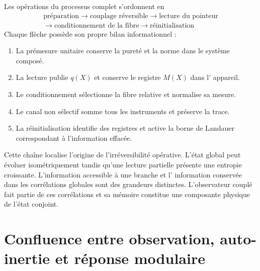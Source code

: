 Les opérations du processus complet s'ordonnent en
\begin{equation}
 \boxed{\begin{gathered}
 \text{préparation}
 \longrightarrow
 \text{couplage réversible}
 \longrightarrow
 \text{lecture du pointeur}\\
 \longrightarrow
 \text{conditionnement de la fibre}
 \longrightarrow
 \text{réinitialisation}
 \end{gathered}}
 \label{eq:rm-obs-measurement-chain}
\end{equation}
Chaque flèche possède son propre bilan informationnel :
\begin{enumerate}[label=\textup{(\roman*)}]
 \item La prémesure unitaire conserve la pureté et la norme dans le système
 composé.
 \item La lecture publie \(q(X)\) et conserve le registre \(M(X)\) dans l'
 appareil.
 \item Le conditionnement sélectionne la fibre relative et normalise sa
 mesure.
 \item Le canal non sélectif somme tous les instruments et préserve la
 trace.
 \item La réinitialisation identifie des registres et active la borne de
 Landauer correspondant à l'information effacée.
\end{enumerate}

Cette chaîne localise l'origine de l'irréversibilité opérative. L'état
global peut évoluer isométriquement tandis qu'une lecture partielle
présente une entropie croissante. L'information accessible à une branche et l'
information conservée dans les corrélations globales sont des grandeurs
distinctes. L'observateur couplé fait partie de ces corrélations et sa
mémoire constitue une composante physique de l'état conjoint.

\section{Confluence entre observation, auto-inertie et réponse modulaire}

